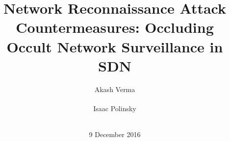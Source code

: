 \documentclass{sig-alternate-05-2015}
\begin{document}
  \title{Network Reconnaissance Attack Countermeasures: Occluding Occult
  Network Surveillance in SDN}
  \author{
    \alignauthor
      Akash Verma\\
      \\
    \alignauthor
      Isaac Polinsky\\
      \\
}
\date{9 December 2016}
\maketitle













 
\end{document}
